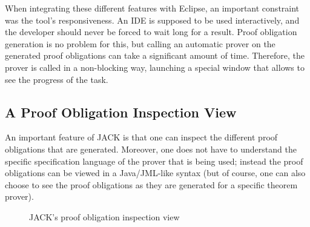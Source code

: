 When integrating these different features with Eclipse, an important
constraint was the tool's responsiveness. An IDE is supposed to be
used interactively, and the developer should never be forced to wait
long for a result. Proof obligation generation is no problem for this,
but calling an automatic prover on the generated proof obligations can
take a significant amount of time. Therefore, the prover is called in
a non-blocking way, launching a special window that allows to see the
progress of the task.

\subsection{A Proof Obligation Inspection View}

An important feature of JACK is that one can inspect the different
proof obligations that are generated. Moreover, one does not have to
understand the specific specification language of the prover that is
being used; instead the proof obligations can be viewed in a
Java/JML-like syntax (but of course, one can also choose to see the
proof obligations as they are generated for a specific theorem
prover). 

\begin{figure}[t!]
\caption{JACK's proof obligation inspection view}\label{FigJackView}
\end{figure}

